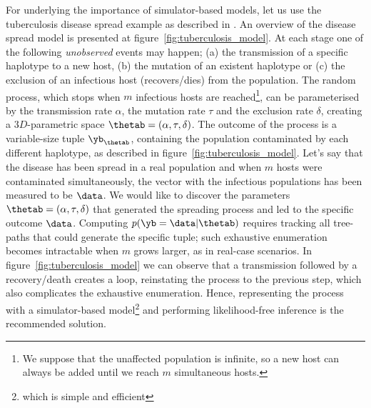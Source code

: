 For underlying the importance of simulator-based models, let us use
the tuberculosis disease spread example as described in
\cite{Tanaka2006}. An overview of the disease spread model is
presented at figure~\ref{fig:tuberculosis_model}. At each stage one of
the following \textit{unobserved} events may happen; (a) the
transmission of a specific haplotype to a new host, (b) the mutation
of an existent haplotype or (c) the exclusion of an infectious host
(recovers/dies) from the population. The random process, which stops
when $m$ infectious hosts are reached\footnote{We suppose that the
  unaffected population is infinite, so a new host can always be added
  until we reach $m$ simultaneous hosts.}, can be parameterised by the
transmission rate $\alpha$, the mutation rate $\tau$ and the exclusion
rate $\delta$, creating a $3D$-parametric space
$\thetab = (\alpha, \tau, \delta)$. The outcome of the process is a
variable-size tuple $\yb_{\thetab}$, containing the population
contaminated by each different haplotype, as described in
figure~\ref{fig:tuberculosis_model}. Let's say that the disease has
been spread in a real population and when $m$ hosts were contaminated
simultaneously, the vector with the infectious populations has been
measured to be $\data$. We would like to discover the parameters
$\thetab = (\alpha, \tau, \delta)$ that generated the spreading
process and led to the specific outcome $\data$. Computing
$p(\yb=\data|\thetab)$ requires tracking all tree-paths that could
generate the specific tuple; such exhaustive enumeration becomes
intractable when $m$ grows larger, as in real-case scenarios. In
figure~\ref{fig:tuberculosis_model} we can observe that a transmission
followed by a recovery/death creates a loop, reinstating the process
to the previous step, which also complicates the exhaustive
enumeration. Hence, representing the process with a simulator-based
model\footnote{which is simple and efficient} and performing
likelihood-free inference is the recommended solution.

